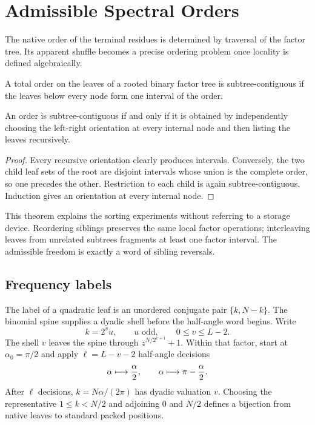 \section{Admissible Spectral Orders}
\label{sec:orders}

The native order of the terminal residues is determined by traversal of the
factor tree.  Its apparent shuffle becomes a precise ordering problem once
locality is defined algebraically.

\begin{definition}
A total order on the leaves of a rooted binary factor tree is
subtree-contiguous if the leaves below every node form one interval of the
order.
\end{definition}

\begin{theorem}
An order is subtree-contiguous if and only if it is obtained by independently
choosing the left-right orientation at every internal node and then listing the
leaves recursively.
\end{theorem}
\begin{proof}
Every recursive orientation clearly produces intervals.  Conversely, the two
child leaf sets of the root are disjoint intervals whose union is the complete
order, so one precedes the other.  Restriction to each child is again
subtree-contiguous.  Induction gives an orientation at every internal node.
\end{proof}

This theorem explains the sorting experiments without referring to a storage
device.  Reordering siblings preserves the same local factor operations;
interleaving leaves from unrelated subtrees fragments at least one factor
interval.  The admissible freedom is exactly a word of sibling reversals.

\subsection{Frequency labels}

The label of a quadratic leaf is an unordered conjugate pair
$\{k,N-k\}$.  The binomial spine supplies a dyadic shell before the half-angle
word begins.  Write
\begin{equation}
 k=2^v u,\qquad u\text{ odd},\qquad0\le v\le L-2.
 \label{eq:dyadic-shell}
\end{equation}
The shell $v$ leaves the spine through
$z^{N/2^{v+1}}+1$.  Within that factor, start at $\alpha_0=\pi/2$ and apply
$\ell=L-v-2$ half-angle decisions
\begin{equation}
 \alpha\longmapsto {\alpha\over2},
 \qquad
 \alpha\longmapsto \pi-{\alpha\over2}.
 \label{eq:angle-address}
\end{equation}
After $\ell$ decisions, $k=N\alpha/(2\pi)$ has dyadic valuation $v$.  Choosing the
representative $1\le k<N/2$ and adjoining $0$ and $N/2$ defines a bijection from
native leaves to standard packed positions.

